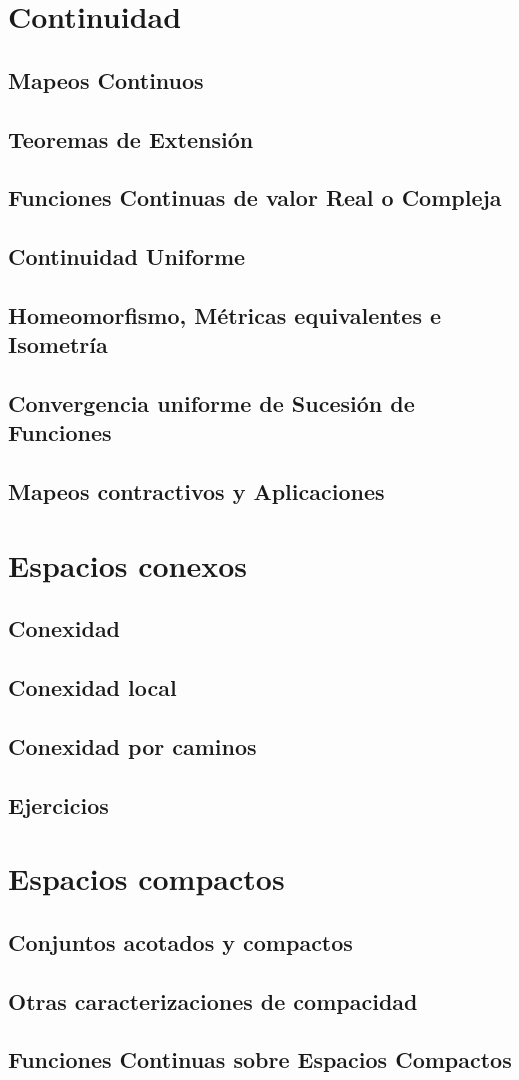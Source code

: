 \documentclass{book}
\begin{document}
\chapter{Continuidad}
\section{Mapeos Continuos}
\section{Teoremas de Extensión}
\section{Funciones Continuas de valor Real o Compleja}
\section{Continuidad Uniforme}
\section{Homeomorfismo, Métricas equivalentes e Isometría}
\section{Convergencia uniforme de Sucesión de Funciones}
\section{Mapeos contractivos y Aplicaciones}

\chapter{Espacios conexos}
\section{Conexidad}
\section{Conexidad local}
\section{Conexidad por caminos}
\section{Ejercicios}

\chapter{Espacios compactos}
\section{Conjuntos acotados y compactos}
\section{Otras caracterizaciones de compacidad}
\section{Funciones Continuas sobre Espacios Compactos}
\end{document}
